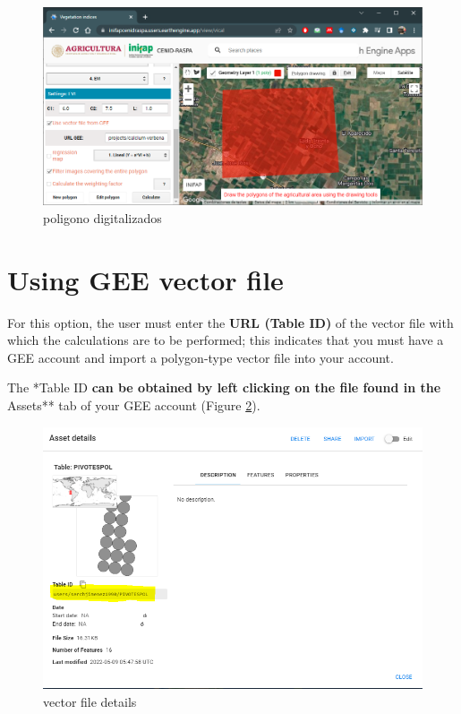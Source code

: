 \documentclass[
]{book}
\begin{document}
\begin{figure}

{\centering \includegraphics[width=0.75\linewidth]{./images/Figure13} 

}

\caption{poligono digitalizados}\label{fig:figG11}
\end{figure}

\hypertarget{using-gee-vector-file}{%
\section{Using GEE vector file}\label{using-gee-vector-file}}

For this option, the user must enter the \textbf{URL (Table ID)} of the vector file with which the calculations are to be performed; this indicates that you must have a GEE account and import a polygon-type vector file into your account.

The *Table ID\textbf{ can be obtained by left clicking on the file found in the }Assets** tab of your GEE account (Figure \ref{fig:figG12}).

\begin{figure}

{\centering \includegraphics[width=0.75\linewidth]{./images/Figure14} 

}

\caption{vector file details}\label{fig:figG12}
\end{figure}
\end{document}
